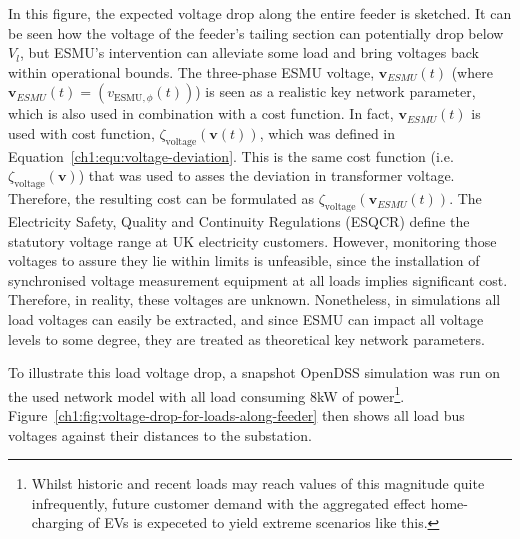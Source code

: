 In this figure, the expected voltage drop along the entire feeder is sketched. 
It can be seen how the voltage of the feeder's tailing section can potentially drop below $V_l$, but ESMU's intervention can alleviate some load and bring voltages back within operational bounds.
The three-phase ESMU voltage, $\textbf{v}_{ESMU}(t)$ (where $\textbf{v}_{ESMU}(t) = (v_{\text{ESMU},\phi}(t))$) is seen as a realistic key network parameter, which is also used in combination with a cost function.
In fact, $\textbf{v}_{ESMU}(t)$ is used with cost function, $\zeta_\text{voltage}(\textbf{v}(t))$, which was defined in Equation~\ref{ch1:equ:voltage-deviation}.
This is the same cost function (i.e. $\zeta_\text{voltage}(\textbf{v})$) that was used to asses the deviation in transformer voltage.
Therefore, the resulting cost can be formulated as $\zeta_\text{voltage}(\textbf{v}_{ESMU}(t))$.
The Electricity Safety, Quality and Continuity Regulations (ESQCR) define the statutory voltage range at UK electricity customers.
However, monitoring those voltages to assure they lie within limits is unfeasible, since the installation of synchronised voltage measurement equipment at all loads implies significant cost.
Therefore, in reality, these voltages are unknown.
Nonetheless, in simulations all load voltages can easily be extracted, and since ESMU can impact all voltage levels to some degree, they are treated as theoretical key network parameters.

To illustrate this load voltage drop, a snapshot OpenDSS simulation was run on the used network model with all load consuming  8kW of power\footnote{Whilst historic and recent loads may reach values of this magnitude quite infrequently, future customer demand with the aggregated effect home-charging of EVs is expeceted to yield extreme scenarios like this.}.
Figure~\ref{ch1:fig:voltage-drop-for-loads-along-feeder} then shows all load bus voltages against their distances to the substation.




